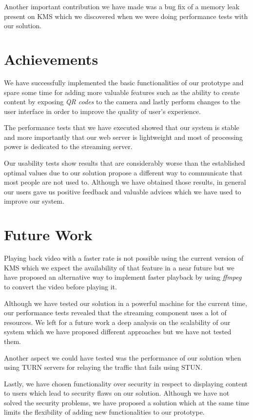 Another important contribution we have made was a bug fix of a memory leak present on \ac{KMS} which we discovered when we were doing performance tests with our solution.

\section{Achievements}
\label{section:achievements}
	We have successfully implemented the basic functionalities of our prototype and spare some time for adding more valuable features such as the ability to create content by exposing \emph{QR codes} to the camera and lastly perform changes to the user interface in order to improve the quality of user's experience.

	The performance tests that we have executed showed that our system is stable and more importantly that our web server is lightweight and most of processing power is dedicated to the streaming server.

	Our usability tests show results that are considerably worse than the established optimal values due to our solution propose a different way to communicate that most people are not used to. Although we have obtained those results, in general our users gave us positive feedback and valuable advices which we have used to improve our system. 

\section{Future Work}
\label{section:future}
	Playing back video with a faster rate is not possible using the current version of \ac{KMS} which we expect the availability of that feature in a near future but we have proposed an alternative way to implement faster playback by using \emph{ffmpeg} to convert the video before playing it.

	Although we have tested our solution in a powerful machine for the current time, our performance tests revealed that the streaming component uses a lot of resources. We left for a future work a deep analysis on the scalability of our system which we have proposed different approaches but we have not tested them.

	Another aspect we could have tested was the performance of our solution when using \ac{TURN} servers for relaying the traffic that fails using \ac{STUN}.

	Lastly, we have chosen functionality over security in respect to displaying content to users which lead to security flaws on our solution. Although we have not solved the security problems, we have proposed a solution which at the same time limits the flexibility of adding new functionalities to our prototype.
\cleardoublepage
